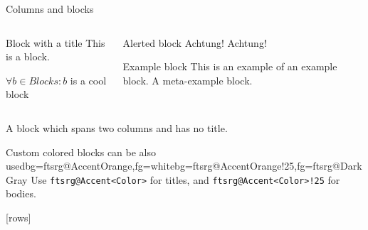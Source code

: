 \documentclass[t,aspectratio=169]{beamer}
\begin{document}
\begin{frame}{Columns and blocks}
  \begin{columns}
    \begin{column}{0.49\linewidth}
      \begin{block}{Block with a title}
        This is a block.\strut
      \end{block}

      \begin{theorem}
        $\forall b \in \textit{Blocks} : b$ is a cool block
      \end{theorem}
    \end{column}

    \begin{column}{0.49\linewidth}
      \begin{alertblock}{Alerted block}
        Achtung! \alert{Achtung!}\strut
      \end{alertblock}

      \begin{exampleblock}{Example block}
        This is an example of an example block. A meta-example block.
      \end{exampleblock}
    \end{column}
  \end{columns}

  \vspace{1ex}

  \begin{block}{}
    A block which spans two columns and has no title.
  \end{block}
  \vspace{1ex}
  \begin{coloredblock}{Custom colored blocks can be also used}{bg=ftsrg@AccentOrange,fg=white}{bg=ftsrg@AccentOrange!25,fg=ftsrg@DarkGray}
    Use \texttt{ftsrg@Accent<Color>} for titles, and \texttt{ftsrg@Accent<Color>!25} for bodies.
  \end{coloredblock}
\end{frame}

[rows]
\end{document}
